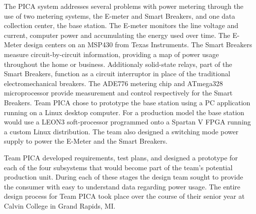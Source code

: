 The PICA system addresses several problems with power metering through the use of two metering systems, the E-meter and Smart Breakers, and one data collection center, the base station. The E-meter monitors the line voltage and current, computer power and accumulating the energy used over time. The E-Meter design centers on an MSP430 from Texas Instruments. The Smart Breakers measure circuit-by-circuit information, providing a map of power usage throughout the home or business. Additionaly solid-state relays, part of the Smart Breakers, function as a circuit interruptor in place of the traditional electromechanical breakers. The ADE776 metering chip and ATmega328 microprocessor provide measurement and control respectively for the Smart Breakers. Team PICA chose to prototype the base station using a PC application running on a Linux desktop computer. For a production model the base station would  use a LEON3 soft-processor programmed onto a Spartan V FPGA running  a custom Linux distribution. The team also designed a switching mode power supply to power the E-Meter and the Smart Breakers.

Team PICA developed requirements, test plans, and designed a prototype for each of the four subsystems that would become part of the team's potential production unit. During each of these stages the design team sought to provide the consumer with easy to understand data regarding power usage. The entire design process for Team PICA took place over the course of their senior year at Calvin College in Grand Rapids, MI.